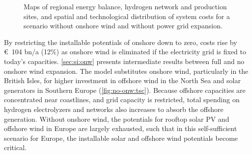 \begin{figure}
    \centering
    \caption{Maps of regional energy balance, hydrogen network and production sites, and spatial and technological distribution of system costs for a scenario without onshore wind and without power grid expansion.}
    \label{fig:no-onw}
\end{figure}


By restricting the installable potentials of onshore down to zero, costs rise by
\euro~104 bn/a (12\%) as onshore wind is eliminated if the electricity grid is
fixed to today's capacities. \cref{sec:si:onw} presents intermediate results
between full and no onshore wind expansion. The model substitutes onshore wind,
particularly in the British Isles, for higher investment in offshore wind in the
North Sea and solar generators in Southern Europe (\cref{fig:no-onw:tsc}).
Because offshore capacities are concentrated near coastlines, and grid capacity
is restricted, total spending on hydrogen electrolyzers and networks also
increases to absorb the offshore generation. Without onshore wind, the
potentials for rooftop solar PV and offshore wind in Europe are largely
exhausted, such that in this self-sufficient scenario for Europe, the
installable solar and offshore wind potentials become critical.

